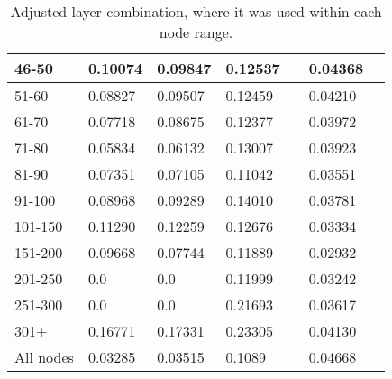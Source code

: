 \begin{table*}[h!]
\begin{tabular}{|l|l|l||l|l||l|l|}
        46-50     & 0.10074                                 & 0.09847                        & 0.12537                          &                  & 0.04368       &                  \\ \hline
        51-60     & 0.08827                                 & 0.09507                        & 0.12459                          &                  & 0.04210       &                  \\ \hline
        61-70     & 0.07718                                 & 0.08675                        & 0.12377                          &                  & 0.03972       &                  \\ \hline
        71-80     & 0.05834                                 & 0.06132                        & 0.13007                          &                  & 0.03923       &                  \\ \hline
        81-90     & 0.07351                                 & 0.07105                        & 0.11042                          &                  & 0.03551       &                  \\ \hline
        91-100    & 0.08968                                 & 0.09289                        & 0.14010                          &                  & 0.03781       &                  \\ \hline
        101-150   & 0.11290                                 & 0.12259                        & 0.12676                          &                  & 0.03334       &                  \\ \hline
        151-200   & 0.09668                                 & 0.07744                        & 0.11889                          &                  & 0.02932       &                  \\ \hline
        201-250   & 0.0                                     & 0.0                            & 0.11999                          &                  & 0.03242       &                  \\ \hline
        251-300   & 0.0                                     & 0.0                            & 0.21693                          &                  & 0.03617       &                  \\ \hline
        301+      & 0.16771                                 & 0.17331                        & 0.23305                          &                  & 0.04130       &                  \\ \hline
        All nodes & 0.03285                                 & 0.03515                        & 0.1089                           &                  & 0.04668       &                  \\ \hline
    \end{tabular}
    \caption{Adjusted layer combination, where it was used within each node range.}
    \label{tab:ndcg-adjusted-layer-bad-performance}
\end{table*}

